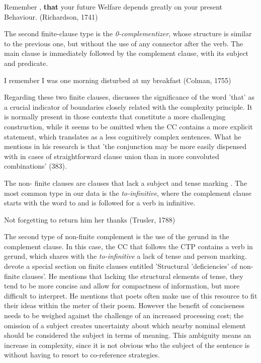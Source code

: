 \documentclass[final]{clv3} %
\begin{document}
\begin{example}
Remember ,\textbf{ that }your future Welfare depends greatly on your present Behaviour. (Richardson, 1741)
\end{example}

The second finite-clause type is the \textit{0-complementizer}, whose structure is similar to the previous one, but without the use of any connector after the verb. The main clause is immediately followed by the complement clause, with its subject and predicate.

\begin{example}
I remember I was one morning disturbed at my breakfast (Colman, 1755)
\end{example}

Regarding these two finite clauses, \citep{rohdenburg1995replacement} discusses the significance of the word 'that' as a crucial indicator of boundaries closely related with the complexity principle. It is normally present in those contexts that constitute a more challenging construction, while it seems to be omitted when the CC contains a more explicit statement, which translates as a less cognitively complex sentences. What he mentions in his research is that 'the conjunction may be more easily dispensed with in cases of straightforward clause union than in more convoluted combinations' (383).

The non- finite clauses are clauses that lack a subject and tense marking \citep{aljovic2017non}. The most common type in our data is the \textit{to-infinitive}, where the complement clause starts with the word to and is followed for a verb in infinitive.

\begin{example}
Not forgetting to return him her thanks (Trusler, 1788)
\end{example}

The second type of non-finite complement is the use of the gerund in the complement clause. In this case, the CC that follows the CTP contains a verb in gerund, which shares with the \textit{to-infinitive} a lack of tense and person marking. \citeauthor{quirk1985comprehensive} devote a special section on finite clauses entitled 'Structural 'deficiencies' of non-finite clauses'. He mentions that lacking the structural elements of tense, they tend to be more concise and allow for compactness of information, but more difficult to interpret. He mentions that poets often make use of this resource to fit their ideas within the meter of their poem. However the benefit of conciseness needs to be weighed against the challenge of an increased processing cost; the omission of a subject creates uncertainty about which nearby nominal element should be considered the subject in terms of meaning. This ambiguity means an increase in complexity, since it is not obvious who the subject of the sentence is without having to resort to co-reference strategies.
\end{document}
